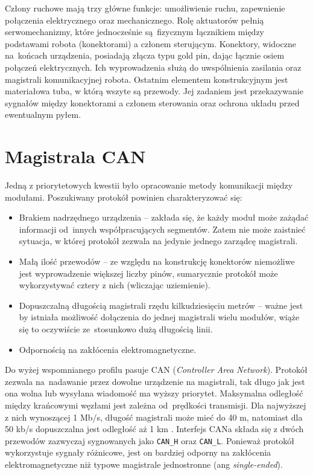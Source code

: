Człony ruchowe mają trzy główne funkcje: umożliwienie ruchu, zapewnienie połączenia elektrycznego oraz mechanicznego. Rolę aktuatorów pełnią serwomechanizmy, które jednocześnie są~fizycznym łącznikiem między podstawami robota (konektorami) a członem sterującym. Konektory, widoczne na~końcach urządzenia, posiadają złącza typu gold pin, dając łącznie osiem połączeń elektrycznych. Ich wyprowadzenia służą do uwspólnienia zasilania oraz magistrali komunikacyjnej robota. Ostatnim elementem konstrukcyjnym jest materiałowa tuba, w którą wszyte są przewody. Jej zadaniem jest przekazywanie sygnałów między konektorami a członem sterowania oraz ochrona układu przed ewentualnym pyłem.

\section{Magistrala CAN}
Jedną z priorytetowych kwestii było opracowanie metody komunikacji między modułami. Poszukiwany protokół powinien charakteryzować się:
    \begin{itemize}
        \item Brakiem nadrzędnego urządzenia -- zakłada się, że każdy moduł może zażądać informacji od~innych współpracujących segmentów. Zatem nie może zaistnieć sytuacja, w której protokół zezwala na jedynie jednego zarządcę magistrali. 
        \item Małą ilość przewodów -- ze względu na konstrukcję konektorów niemożliwe jest wyprowadzenie większej liczby pinów, sumarycznie protokół może wykorzystywać cztery z nich (wliczając uziemienie).
        \item Dopuszczalną długością magistrali rzędu kilkudziesięciu metrów -- ważne jest by istniała możliwość dołączenia do jednej magistrali wielu modułów, wiąże się to oczywiście ze~stosunkowo dużą długością linii.
        \item Odpornością na zakłócenia elektromagnetyczne.
    \end{itemize}
Do wyżej wspomnianego profilu pasuje CAN (\textit{Controller Area Network}). Protokół zezwala na~nadawanie przez dowolne urządzenie na magistrali, tak długo jak jest ona wolna lub wysyłana wiadomość ma wyższy priorytet. Maksymalna odległość między krańcowymi węzłami jest zależna od~prędkości transmisji. Dla najwyższej z nich wynoszącej 1 Mb/s, długość magistrali może mieć do 40 m, natomiast dla 50 kb/s dopuszczalna jest odległość aż 1 km \cite{ds102}. Interfejs CANa składa się z dwóch przewodów zazwyczaj sygnowanych jako \texttt{CAN\_H} oraz \texttt{CAN\_L}. Ponieważ protokół wykorzystuje sygnały różnicowe, jest on bardziej odporny na zakłócenia elektromagnetyczne \cite{sloa101} niż typowe magistrale jednostronne (ang \textit{single-ended}).

